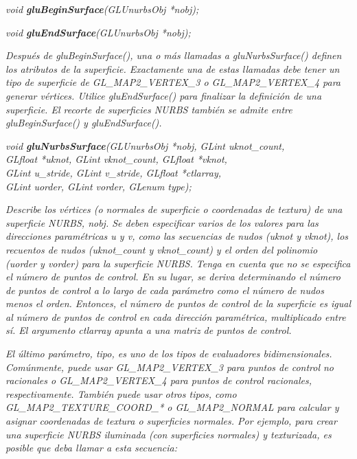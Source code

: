 \begin{description}
    \item \emph{void \textbf{gluBeginSurface}(GLUnurbsObj *nobj);}
    \item \emph{void \textbf{gluEndSurface}(GLUnurbsObj *nobj);}
    \begin{description}
        \item \textit{Después de gluBeginSurface(), una o más llamadas a gluNurbsSurface() definen los atributos de la superficie. Exactamente una de estas llamadas debe tener un tipo de superficie de GL\_MAP2\_VERTEX\_3 o GL\_MAP2\_VERTEX\_4 para generar vértices. Utilice gluEndSurface() para finalizar la definición de una superficie. El recorte de superficies NURBS también se admite entre gluBeginSurface() y gluEndSurface().
        }
    \end{description}
    \item \emph{void \textbf{gluNurbsSurface}(GLUnurbsObj *nobj, GLint uknot\_count,\\
    GLfloat *uknot, GLint vknot\_count, GLfloat *vknot,\\
    GLint u\_stride, GLint v\_stride, GLfloat *ctlarray,\\
    GLint uorder, GLint vorder, GLenum type);}
    \begin{description}
        \item \textit{Describe los vértices (o normales de superficie o coordenadas de textura) de una superficie NURBS, nobj. Se deben especificar varios de los valores para las direcciones paramétricas u y v, como las secuencias de nudos (uknot y vknot), los recuentos de nudos (uknot\_count y vknot\_count) y el orden del polinomio (uorder y vorder) para la superficie NURBS. Tenga en cuenta que no se especifica el número de puntos de control. En su lugar, se deriva determinando el número de puntos de control a lo largo de cada parámetro como el número de nudos menos el orden. Entonces, el número de puntos de control de la superficie es igual al número de puntos de control en cada dirección paramétrica, multiplicado entre sí. El argumento ctlarray apunta a una matriz de puntos de control.
        }
        \item \textit{El último parámetro, tipo, es uno de los tipos de evaluadores bidimensionales. Comúnmente, puede usar GL\_MAP2\_VERTEX\_3 para puntos de control no racionales o GL\_MAP2\_VERTEX\_4 para puntos de control racionales, respectivamente. También puede usar otros tipos, como GL\_MAP2\_TEXTURE\_COORD\_* o GL\_MAP2\_NORMAL para calcular y asignar coordenadas de textura o superficies normales. Por ejemplo, para crear una superficie NURBS iluminada (con superficies normales) y texturizada, es posible que deba llamar a esta secuencia:
}
\end{description}
\end{description}
